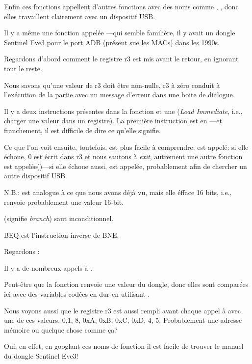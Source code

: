 Enfin ces fonctions appellent d'autres fonctions avec des noms comme ,
, donc elles travaillent clairement avec un dispositif USB.

Il y a même une fonction appelée ---qui semble familière,
il y avait un dongle Sentinel Eve3 pour le port ADB (présent sue les MACs) dans les 1990s.

Regardons d'abord comment le registre r3 est mis avant le retour, en ignorant tout
le reste.

Nous savons qu'une  valeur de r3 doit être non-nulle, r3 à zéro conduit
à l'exécution de la partie avec un message d'erreur dans une boite de dialogue.

Il y a deux instructions  présentes dans la fonction et une 
(\emph{Load Immediate}, i.e., charger une valeur dans un registre).
La première instruction est en ---et franchement, il est difficile
de dire ce qu'elle signifie.

Ce que l'on voit ensuite, toutefois, est plus facile à comprendre:
 est appelé:
si elle échoue, 0 est écrit dans r3 et nous sautons à \emph{exit}, autrement une
autre fonction est appelée()---si elle échoue aussi, 
est appelée, probablement afin de chercher un autre dispositif USB.

N.B.:  est analogue à ce que nous avons déjà vu, mais
elle éfface 16 bits, i.e., \\
renvoie probablement une valeur 16-bit.

 (signifie \emph{branch}) saut inconditionnel.

\ac{BEQ} est l'instruction inverse de \ac{BNE}.

Regardons :



Il y a de nombreux appels à .

Peut-être que la fonction renvoie une valeur du dongle, donc elles sont comparées
ici avec des variables codées en dur en utilisant .

Nous voyons aussi que le registre r3 est aussi rempli avant chaque appel à 
avec une de ces valeurs: 0,1, 8, 0xA, 0xB, 0xC, 0xD, 4, 5.
Probablement une adresse mémoire ou quelque chose comme ça?

Oui, en effet, en googlant ces noms de fonction il est facile de trouver le manuel
du dongle Sentinel Eve3!

